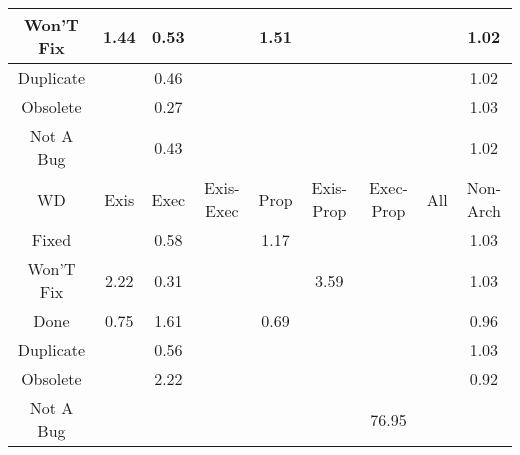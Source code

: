 \begin{tabular}{|c||c|c|c|c|c|c|c|c|}
\hline
Won'T Fix & \cellcolor[rgb]{0.9078097128119976,0.8389624955425251,0.42} 1.44 & \cellcolor[rgb]{0.830942193533619,0.4657930493924626,0.3462127139647109} 0.53 &  & \cellcolor[rgb]{0.9074592262153157,0.8387964755756757,0.42} 1.51 &  &  &  & \cellcolor[rgb]{0.9099231636180902,0.8399636038190953,0.42} 1.02 \\ 
\hline
Duplicate &  & \cellcolor[rgb]{0.8178791833051435,0.40396146764434593,0.33402057108480065} 0.46 &  &  &  &  &  & \cellcolor[rgb]{0.9099057922552769,0.8399553752788155,0.42} 1.02 \\ 
\hline
Obsolete &  & \cellcolor[rgb]{0.786770077281184,0.2567116991309374,0.30498540546243835} 0.27 &  &  &  &  &  & \cellcolor[rgb]{0.9098662040702289,0.8399366229806347,0.42} 1.03 \\ 
\hline
Not A Bug &  & \cellcolor[rgb]{0.813744998673195,0.3843929937197902,0.33016199876164876} 0.43 &  &  &  &  &  & \cellcolor[rgb]{0.909878146687303,0.8399422800097752,0.42} 1.02 \\ 
\hline
\hline
WD & Exis & Exec & Exis-Exec & Prop & Exis-Prop & Exec-Prop & All & Non-Arch \\ 
\hline
Fixed &  & \cellcolor[rgb]{0.838969512131521,0.5037890240891993,0.35370487798941963} 0.58 &  & \cellcolor[rgb]{0.9091344205137997,0.8395899886644314,0.42} 1.17 &  &  &  & \cellcolor[rgb]{0.9098738973515929,0.8399402671665439,0.42} 1.03 \\ 
\hline
Won'T Fix & \cellcolor[rgb]{0.90387610112918,0.8370992057980325,0.42} 2.22 & \cellcolor[rgb]{0.7932518265075541,0.2873919788024223,0.3110350380737171} 0.31 &  &  & \cellcolor[rgb]{0.8970258972180589,0.8338543723664488,0.42} 3.59 &  &  & \cellcolor[rgb]{0.9098256498309614,0.8399174130778237,0.42} 1.03 \\ 
\hline
Done & \cellcolor[rgb]{0.868300379905612,0.6426217982198965,0.38108035457857115} 0.75 & \cellcolor[rgb]{0.9069252035006765,0.8385435174476887,0.42} 1.61 &  & \cellcolor[rgb]{0.8581950790136161,0.5947900406644501,0.37164874041270846} 0.69 &  &  &  & \cellcolor[rgb]{0.9039569253561303,0.8113961133523501,0.41435979699905495} 0.96 \\ 
\hline
Duplicate &  & \cellcolor[rgb]{0.8356717695177456,0.4881797090506621,0.3506269848832292} 0.56 &  &  &  &  &  & \cellcolor[rgb]{0.9098621803444955,0.8399347170052873,0.42} 1.03 \\ 
\hline
Obsolete &  & \cellcolor[rgb]{0.9038923717347512,0.8371069129269874,0.42} 2.22 &  &  &  &  &  & \cellcolor[rgb]{0.8963860194474493,0.7755604920512599,0.40729361815095266} 0.92 \\ 
\hline
Not A Bug &  &  &  &  &  & \cellcolor[rgb]{0.53,0.66,0.42} 76.95 &  &  \\ 
\hline
\end{tabular}